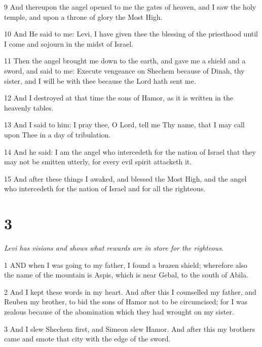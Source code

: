 \par 9 And thereupon the angel opened to me the gates of heaven, and I saw the holy temple, and upon a throne of glory the Most High.

\par 10 And He said to me: Levi, I have given thee the blessing of the priesthood until I come and sojourn in the midst of Israel.

\par 11 Then the angel brought me down to the earth, and gave me a shield and a sword, and said to me: Execute vengeance on Shechem because of Dinah, thy sister, and I will be with thee because the Lord hath sent me.

\par 12 And I destroyed at that time the sons of Hamor, as it is written in the heavenly tables.

\par 13 And I said to him: I pray thee, O Lord, tell me Thy name, that I may call upon Thee in a day of tribulation.

\par 14 And he said: I am the angel who intercedeth for the nation of Israel that they may not be smitten utterly, for every evil spirit attacketh it.

\par 15 And after these things I awaked, and blessed the Most High, and the angel who intercedeth for the nation of Israel and for all the righteous.

\chapter{3}

\par \textit{Levi has visions and shows what rewards are in store for the righteous.}

\par 1 AND when I was going to my father, I found a brazen shield; wherefore also the name of the mountain is Aspis, which is near Gebal, to the south of Abila.

\par 2 And I kept these words in my heart. And after this I counselled my father, and Reuben my brother, to bid the sons of Hamor not to be circumcised; for I was zealous because of the abomination which they had wrought on my sister.

\par 3 And I slew Shechem first, and Simeon slew Hamor. And after this my brothers came and smote that city with the edge of the sword.

